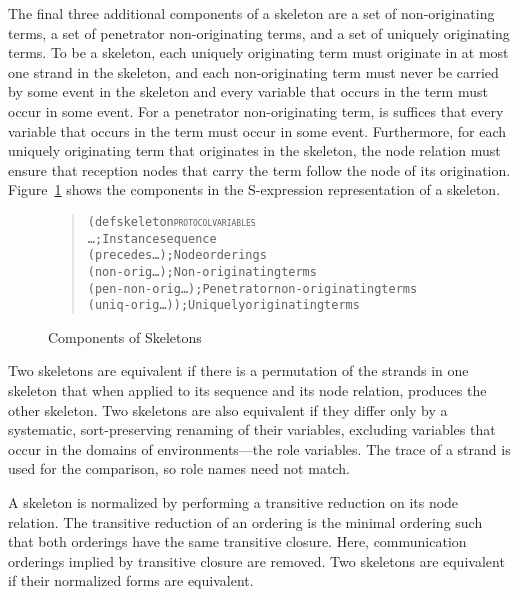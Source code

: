 \documentclass[12pt]{article}
\begin{document}
The final three additional components of a skeleton are a set of
non-originating terms, a set of penetrator non-originating terms, and
a set of uniquely originating terms.  To be a skeleton, each uniquely
originating term must originate in at most one strand in the skeleton,
and each non-originating term must never be carried by some event in
the skeleton and every variable that occurs in the term must occur in
some event.  For a penetrator non-originating term, is suffices that
every variable that occurs in the term must occur in some event.
Furthermore, for each uniquely originating term that originates in the
skeleton, the node relation must ensure that reception nodes that
carry the term follow the node of its origination.
Figure~\ref{fig:skeleton} shows the components in the S-expression
representation of a skeleton.

\begin{figure}
\begin{quote}
\begin{alltt}
(defskeleton \textsc{protocol} \textsc{variables}
   \ldots                ; Instance sequence
   (precedes \ldots)     ; Node orderings
   (non-orig \ldots)     ; Non-originating terms
   (pen-non-orig \ldots) ; Penetrator non-originating terms
   (uniq-orig \ldots))   ; Uniquely originating terms
\end{alltt}
\end{quote}
\caption{Components of Skeletons}\label{fig:skeleton}
\end{figure}

Two skeletons are equivalent if there is a permutation of the strands
in one skeleton that when applied to its sequence and its node
relation, produces the other skeleton.  Two skeletons are also
equivalent if they differ only by a systematic, sort-preserving
renaming of their variables, excluding variables that occur in the
domains of environments---the role variables.  The trace of a strand
is used for the comparison, so role names need not match.

A skeleton is normalized by performing a transitive reduction on its
node relation.  The transitive reduction
of an ordering is the minimal ordering such that both orderings have
the same transitive closure.  Here, communication orderings implied by
transitive closure are removed.  Two skeletons are equivalent if their
normalized forms are equivalent.
\end{document}
